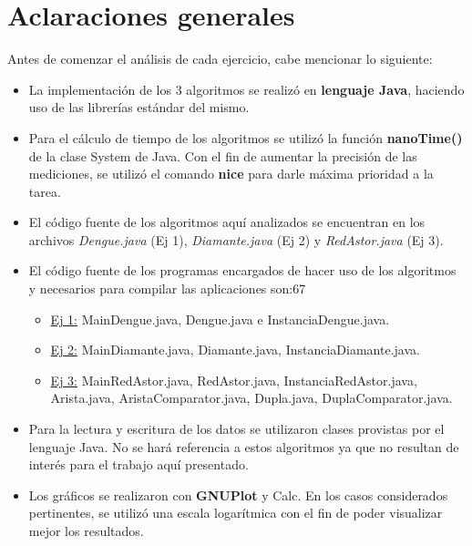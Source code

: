 \documentclass[a4paper,11pt] {article}
\begin{document}
\grupo{}

\maketitle

\bigskip
\section*{Aclaraciones generales}

Antes de comenzar el an\'alisis de cada ejercicio, cabe mencionar lo siguiente: 

\begin{itemize}
 \item La implementaci\'on de los 3 algoritmos se realiz\'o en \textbf{lenguaje Java}, haciendo uso de las librer\'ias est\'andar del mismo.
 \item Para el c\'alculo de tiempo de los algoritmos se utiliz\'o la funci\'on \textbf{nanoTime()} de la clase System de Java. Con el fin de aumentar la precisi\'on de las mediciones, se utiliz\'o el comando \textbf{nice} para darle m\'axima prioridad a la tarea.
 \item El c\'odigo fuente de los algoritmos aqu\'i analizados se encuentran en los archivos \textit{Dengue.java} (Ej 1), \textit{Diamante.java} (Ej 2) y \textit{RedAstor.java} (Ej 3).
 \item El c\'odigo fuente de los programas encargados de hacer uso de los algoritmos y necesarios para compilar las aplicaciones son:67
 \begin{itemize}
    \item \underline{Ej 1:} MainDengue.java, Dengue.java e InstanciaDengue.java.
    \item \underline{Ej 2:} MainDiamante.java, Diamante.java, InstanciaDiamante.java.
    \item \underline{Ej 3:} MainRedAstor.java, RedAstor.java, InstanciaRedAstor.java, Arista.java, AristaComparator.java, Dupla.java, DuplaComparator.java.
  \end{itemize}
 \item Para la lectura y escritura de los datos se utilizaron clases provistas por el lenguaje Java. No se har\'a referencia a estos algoritmos ya que no resultan de inter\'es para el trabajo aqu\'i presentado.
 \item Los gr\'aficos se realizaron con \textbf{GNUPlot} y Calc. En los casos considerados pertinentes, se utiliz\'o una escala logar\'itmica con el fin de poder visualizar mejor los resultados.
\end{itemize}
\end{document}
